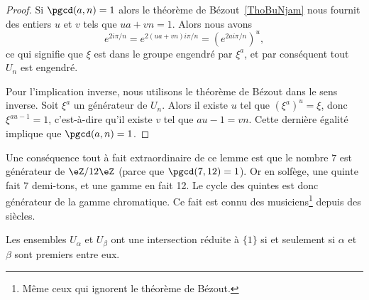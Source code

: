 \begin{proof}
	Si \( \pgcd(a,n)=1\) alors le théorème de Bézout~\ref{ThoBuNjam} nous fournit des entiers \( u\) et \( v\) tels que \( ua+vn=1\). Alors nous avons
	\begin{equation}
		e^{2i\pi /n}= e^{2(ua+vn)i\pi/n}=( e^{2ai\pi/n})^u,
	\end{equation}
	ce qui signifie que \( \xi\) est dans le groupe engendré par \( \xi^a\), et par conséquent tout \( U_n\) est engendré.

	Pour l'implication inverse, nous utilisons le théorème de Bézout dans le sens inverse. Soit \( \xi^a\) un générateur de \( U_n\). Alors il existe \( u\) tel que \( (\xi^a)^u=\xi\), donc \( \xi^{au-1}=1\), c'est-à-dire qu'il existe \( v\) tel que \( au-1=vn\). Cette dernière égalité implique que \( \pgcd(a,n)=1\).
\end{proof}

\begin{example}
	Une conséquence tout à fait extraordinaire de ce lemme est que le nombre \( 7\) est générateur de \( \eZ/12\eZ\) (parce que \( \pgcd(7,12)=1\)). Or en solfège, une quinte fait \( 7\) demi-tons, et une gamme en fait 12. Le cycle des quintes est donc générateur de la gamme chromatique\cite{YDXsAM}. Ce fait est connu des musiciens\footnote{Même ceux qui ignorent le théorème de Bézout.} depuis des siècles.
\end{example}

\begin{proposition}      \label{PROPooIOQEooGMcCJm}
	Les ensembles \( U_{\alpha}\) et \( U_{\beta}\) ont une intersection réduite à \( \{ 1 \}\) si et seulement si \( \alpha\) et \( \beta\) sont premiers entre eux.
\end{proposition}

